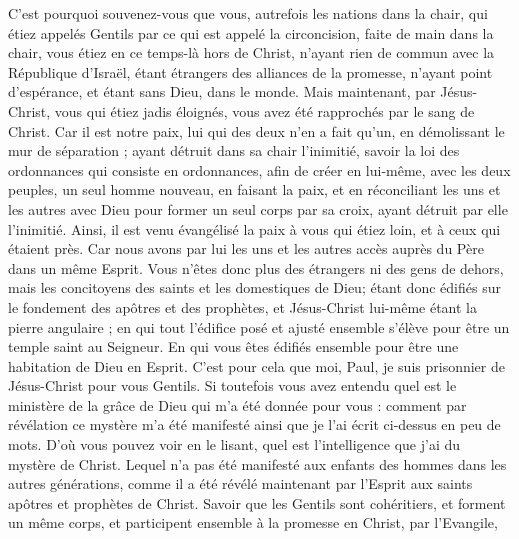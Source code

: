 \begin{multicols}{2}
C'est pourquoi souvenez-vous que vous, autrefois les nations dans la chair, qui étiez appelés Gentils par ce qui est appelé la circoncision, faite de main dans la chair,
vous étiez en ce temps-là hors de Christ, n'ayant rien de commun avec la République d'Israël, étant étrangers des alliances de la promesse, n'ayant point d'espérance, et étant sans Dieu, dans le monde.
Mais maintenant, par Jésus-Christ, vous qui étiez jadis éloignés, vous avez été rapprochés par le sang de Christ.
Car il est notre paix, lui qui des deux n'en a fait qu'un, en démolissant le mur de séparation ;
ayant détruit dans sa chair l'inimitié, savoir la loi des ordonnances qui consiste en ordonnances, afin de créer en lui-même, avec les deux peuples, un seul homme nouveau, en faisant la paix,
et en réconciliant les uns et les autres avec Dieu pour former un seul corps par sa croix, ayant détruit par elle l'inimitié.
Ainsi, il est venu évangélisé la paix à vous qui étiez loin, et à ceux qui étaient près.
Car nous avons par lui les uns et les autres accès auprès du Père dans un même Esprit.
Vous n'êtes donc plus des étrangers ni des gens de dehors, mais les concitoyens des saints et les domestiques de Dieu;
étant donc édifiés sur le fondement des apôtres et des prophètes, et Jésus-Christ lui-même étant la pierre angulaire ;
en qui tout l'édifice posé et ajusté ensemble s'élève pour être un temple saint au Seigneur.
En qui vous êtes édifiés ensemble pour être une habitation de Dieu en Esprit.
\VerseOne{}C'est pour cela que moi, Paul, je suis prisonnier de Jésus-Christ pour vous Gentils.
Si toutefois vous avez entendu quel est le ministère de la grâce de Dieu qui m'a été donnée pour vous :
comment par révélation ce mystère m'a été manifesté ainsi que je l'ai écrit ci-dessus en peu de mots.
D'où vous pouvez voir en le lisant, quel est l'intelligence que j'ai du mystère de Christ.
Lequel n'a pas été manifesté aux enfants des hommes dans les autres générations, comme il a été révélé maintenant par l'Esprit aux saints apôtres et prophètes de Christ.
Savoir que les Gentils sont cohéritiers, et forment un même corps, et participent ensemble à la promesse en Christ, par l'Evangile,

\end{multicols}
